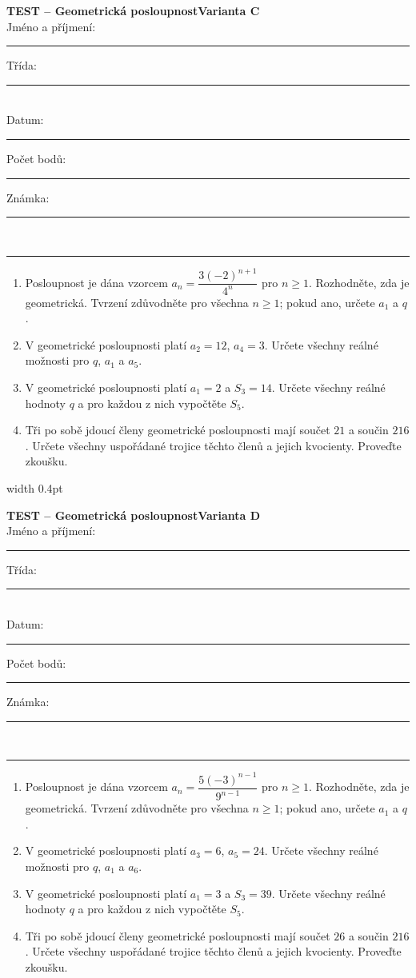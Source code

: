 \documentclass[a4paper,10pt,landscape]{article}
\newcommand{\TestTitle}{Geometrická posloupnost}
\newcommand{\TestHeader}[1]{%
    {\bfseries TEST -- \TestTitle}\hfill{\bfseries Varianta #1}\\[2mm]
    Jméno a příjmení: \rule{4.5cm}{0.4pt}\hfill Třída: \rule{1.5cm}{0.4pt}\\[2mm]
    Datum: \rule{2.4cm}{0.4pt}\hfill Počet bodů: \rule{1.4cm}{0.4pt}\hfill Známka: \rule{1.4cm}{0.4pt}\\[1mm]
    \hrule\vspace{3mm}
}
\newcommand{\AnswerSpace}[1]{\vspace{#1}}
\begin{document}
\noindent
\begin{minipage}[t]{0.48\textwidth}
    \small
    \TestHeader{C}

    \begin{enumerate}
        \item Posloupnost je dána vzorcem $a_n=\dfrac{3(-2)^{n+1}}{4^n}$ pro $n\geq1$. Rozhodněte, zda je geometrická. Tvrzení zdůvodněte pro všechna $n\geq1$; pokud ano, určete $a_1$ a $q$.
        \AnswerSpace{23mm}
        \item V geometrické posloupnosti platí $a_2=12$, $a_4=3$. Určete všechny reálné možnosti pro $q$, $a_1$ a $a_5$.
        \AnswerSpace{27mm}
        \item V geometrické posloupnosti platí $a_1=2$ a $S_3=14$. Určete všechny reálné hodnoty $q$ a pro každou z nich vypočtěte $S_5$.
        \AnswerSpace{30mm}
        \item Tři po sobě jdoucí členy geometrické posloupnosti mají součet $21$ a součin $216$. Určete všechny uspořádané trojice těchto členů a jejich kvocienty. Proveďte zkoušku.
        \AnswerSpace{27mm}
    \end{enumerate}
\end{minipage}%
\hfill\vrule width 0.4pt\hfill
\begin{minipage}[t]{0.48\textwidth}
    \small
    \TestHeader{D}

    \begin{enumerate}
        \item Posloupnost je dána vzorcem $a_n=\dfrac{5(-3)^{n-1}}{9^{n-1}}$ pro $n\geq1$. Rozhodněte, zda je geometrická. Tvrzení zdůvodněte pro všechna $n\geq1$; pokud ano, určete $a_1$ a $q$.
        \AnswerSpace{23mm}
        \item V geometrické posloupnosti platí $a_3=6$, $a_5=24$. Určete všechny reálné možnosti pro $q$, $a_1$ a $a_6$.
        \AnswerSpace{27mm}
        \item V geometrické posloupnosti platí $a_1=3$ a $S_3=39$. Určete všechny reálné hodnoty $q$ a pro každou z nich vypočtěte $S_5$.
        \AnswerSpace{30mm}
        \item Tři po sobě jdoucí členy geometrické posloupnosti mají součet $26$ a součin $216$. Určete všechny uspořádané trojice těchto členů a jejich kvocienty. Proveďte zkoušku.
        \AnswerSpace{27mm}
    \end{enumerate}
\end{minipage}
\end{document}
